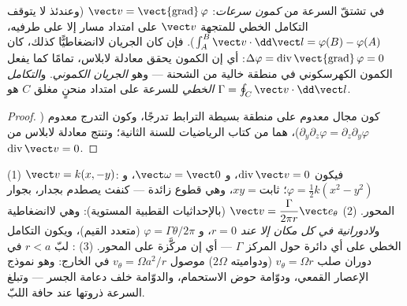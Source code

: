 \begin{definition}\label{def:b2:fluid-kinematics:potential}
في  تشتقّ السرعة من \emph{كمون سرعات}:
$\vect v = \operatorname{\vect{grad}}\varphi$ (وعندئذ لا يتوقف التكامل
الخطي للمتجهة $\vect v$ على امتداد مسار إلا على طرفيه، $\int_A^B\vect v
\cdot\dd\vect l = \varphi(B) - \varphi(A)$). فإن كان الجريان
لاانضغاطيًّا كذلك، كان $\Delta\varphi = \operatorname{div}\operatorname{\vect{grad}}
\varphi = 0$: أي إن الكمون يحقق معادلة لابلاس، تمامًا كما يفعل
الكمون الكهرسكوني في منطقة خالية من الشحنة --- وهو \emph{الجريان
الكموني}. و\emph{التكامل الخطي} للسرعة على امتداد منحنٍ مغلق $C$
هو $\Gamma = \oint_C\vect v\cdot\dd\vect l$.
\end{definition}

\begin{proof}
كون مجال معدوم  على منطقة بسيطة الترابط تدرجًا، وكون
التدرج معدوم  ($\partial_y\partial_z\varphi = \partial_z\partial_y\varphi$)،
هما من كتاب الرياضيات للسنة الثانية؛ وتنتج معادلة لابلاس من
$\operatorname{div}\vect v = 0$.
\end{proof}

\begin{example}\label{ex:b2:fluid-kinematics:planeflows}
(1) \emph{} $\vect v = k(x, -y)$: فيكون $\operatorname{div}\vect v =
0$، و $\vect\omega = \vect 0$، و $\varphi = \tfrac12k(x^2 - y^2)$؛ 
$xy = \text{ثابت}$، وهي قطوع زائدة --- كنفث يصطدم بجدار، بجوار المحور. (2)
\emph{} $\vect v = \dfrac{\Gamma}{2\pi r}\vect e_\theta$ (بالإحداثيات
القطبية المستوية): وهي لاانضغاطية و\emph{لادورانية في كل مكان
إلا عند $r = 0$}، و $\varphi = \Gamma\theta/2\pi$ (متعدد القيم)، ويكون
التكامل الخطي على أي دائرة حول المركز $\Gamma$ --- أي إن
 مركَّزة على المحور. (3) \emph{}: لبّ
$r < a$ في دوران صلب $v_\theta = \Omega r$ (ودواميته $2\Omega$)
موصول  $v_\theta = \Omega a^2/r$ في الخارج: وهو نموذج
الإعصار القمعي، ودوّامة حوض الاستحمام، والدوّامة خلف دعامة
الجسر --- وتبلغ السرعة ذروتها عند حافة اللبّ.
\end{example}

